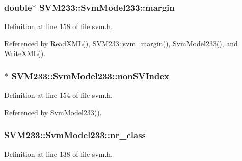 \subsubsection[{\texorpdfstring{margin}{margin}}]{\setlength{\rightskip}{0pt plus 5cm}double$\ast$ S\+V\+M233\+::\+Svm\+Model233\+::margin}\hypertarget{struct_s_v_m233_1_1_svm_model233_a6a178965d1c6ebccdf51af3fc7486d46}{}\label{struct_s_v_m233_1_1_svm_model233_a6a178965d1c6ebccdf51af3fc7486d46}


Definition at line 158 of file svm.\+h.



Referenced by Read\+X\+M\+L(), S\+V\+M233\+::svm\+\_\+margin(), Svm\+Model233(), and Write\+X\+M\+L().

\subsubsection[{\texorpdfstring{non\+S\+V\+Index}{nonSVIndex}}]{$\ast$ S\+V\+M233\+::\+Svm\+Model233\+::non\+S\+V\+Index}\hypertarget{struct_s_v_m233_1_1_svm_model233_a4dad3a53f8d437a2f6964fd350910210}{}\label{struct_s_v_m233_1_1_svm_model233_a4dad3a53f8d437a2f6964fd350910210}


Definition at line 154 of file svm.\+h.



Referenced by Svm\+Model233().

\subsubsection[{\texorpdfstring{nr\+\_\+class}{nr_class}}]{ S\+V\+M233\+::\+Svm\+Model233\+::nr\+\_\+class}\hypertarget{struct_s_v_m233_1_1_svm_model233_a55a9d2b4d87f50f14dfdcc1afc65b47b}{}\label{struct_s_v_m233_1_1_svm_model233_a55a9d2b4d87f50f14dfdcc1afc65b47b}


Definition at line 138 of file svm.\+h.



